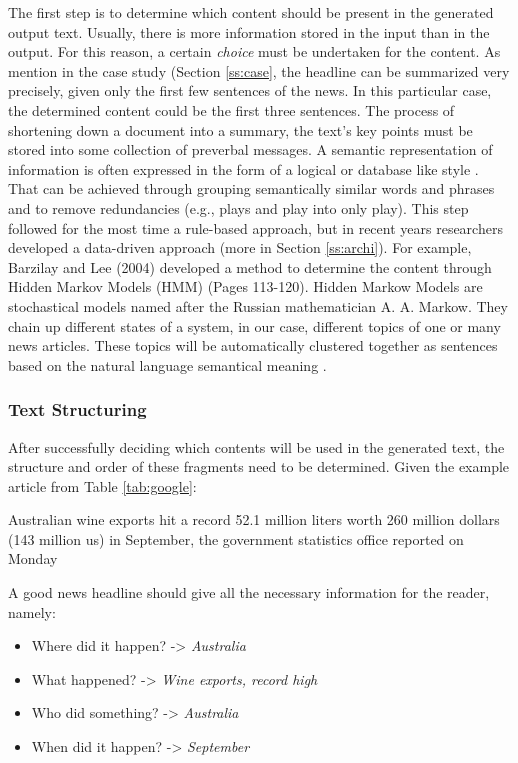 The first step is to determine which content should be present in the generated output text. Usually, there is more information stored in the input than in the output. For this reason, a certain \textit{choice} must be undertaken for the content. As mention in the case study (Section \ref{ss:case}, the headline can be summarized very precisely, given only the first few sentences of the news. In this particular case, the determined content could be the first three sentences. 
The process of shortening down a document into a summary, the text's key points must be stored into some collection of preverbal messages.
A semantic representation of information is often expressed in the form of a logical or database like style \cite{gatt}. That can be achieved through grouping semantically similar words and phrases and to remove redundancies (e.g., plays and play into only play). 
This step followed for the most time a rule-based approach, but in recent years researchers developed a data-driven approach (more in Section \ref{ss:archi}). For example, Barzilay and Lee (2004) developed a method to determine the content through Hidden Markov Models (HMM) \cite{lee} (Pages 113-120). Hidden Markow Models are stochastical models named after the Russian mathematician A. A. Markow. They chain up different states of a system, in our case, different topics of one or many news articles. These topics will be automatically clustered together as sentences based on the natural language semantical meaning \cite{gatt}. 

\subsubsection{Text Structuring}

After successfully deciding which contents will be used in the generated text, the structure and order of these fragments need to be determined. Given the example article from Table \ref{tab:google}:

\begin{tcolorbox}
	\begin{center}
		Australian wine exports hit a record 52.1 million liters worth 260 million dollars (143 million us) in September, the government statistics office reported on Monday 
	\end{center}
\end{tcolorbox}

A good news headline should give all the necessary information for the reader, namely:

\begin{itemize}
	\item Where did it happen? -> \textit{Australia}
	\item What happened? -> \textit{Wine exports, record high}
	\item Who did something? -> \textit{Australia}
	\item When did it happen? -> \textit{September}
\end{itemize}

